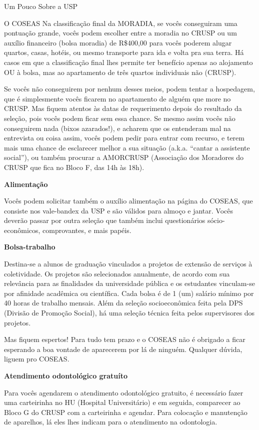 \begin{secao}{Um Pouco Sobre a USP}
\begin{subsecao}{O COSEAS}
Na classificação final da MORADIA, se vocês conseguiram uma pontuação grande, vocês
podem escolher entre a moradia no CRUSP ou um auxílio financeiro (bolsa moradia)
de R\$400,00 para vocês poderem alugar quartos, casas, hotéis, ou mesmo transporte
para ida e volta pra sua terra. Há casos em que a classificação final lhes
permite ter benefício apenas ao alojamento OU à bolsa, mas ao apartamento de
três quartos individuais não (CRUSP).

Se vocês não conseguirem por nenhum desses meios, podem tentar a hospedagem, que é
simplesmente vocês ficarem no apartamento de alguém que more no CRUSP. Mas fiquem
atentos às datas de requerimento depois do resultado da seleção, pois vocês podem
ficar sem essa chance. Se mesmo assim vocês não conseguirem nada (bixos azarados!),
e acharem que os entenderam mal na entrevista ou coisa assim, vocês podem pedir para
entrar com recurso, e terem mais uma chance de esclarecer melhor a sua situação
(a.k.a. “cantar a assistente social”), ou também procurar a
AMORCRUSP (Associação dos Moradores do CRUSP que fica no Bloco F, das 14h às 18h).

{\bf Alimentação}

Vocês podem solicitar também o auxílio alimentação na página do COSEAS, que
consiste nos vale-bandex da USP e são válidos para almoço e jantar. Vocês deverão
passar por outra seleção que também inclui questionários sócio-econômicos,
comprovantes, e mais papéis.

{\bf Bolsa-trabalho}

Destina-se a alunos de graduação vinculados a projetos de extensão de serviços à
coletividade. Os projetos são selecionados anualmente, de acordo com sua relevância
para as finalidades da universidade pública e os estudantes vinculam-se por
afinidade acadêmica ou científica. Cada bolsa é de 1 (um) salário mínimo por
40 horas de trabalho mensais. Além da seleção socioeconômica feita pela
DPS (Divisão de Promoção Social), há uma seleção técnica feita pelos supervisores
dos projetos.

Mas fiquem espertos! Para tudo tem prazo e o COSEAS não é obrigado a ficar esperando a
boa vontade de aparecerem por lá de ninguém. Qualquer dúvida, liguem pro COSEAS.

{\bf Atendimento odontológico gratuíto}

Para vocês agendarem o atendimento odontológico gratuito, é necessário fazer uma
carteirinha no HU (Hospital Universitário) e em seguida, comparecer ao Bloco G
do CRUSP com a carteirinha e agendar. Para colocação e manutenção de aparelhos,
lá eles lhes indicam para o atendimento na odontologia.


\end{subsecao}
\end{secao}
